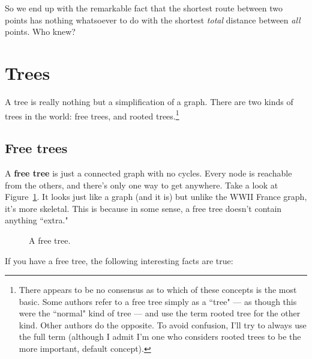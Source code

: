 So we end up with the remarkable fact that the shortest route between two
points has nothing whatsoever to do with the shortest \textit{total}
distance between \textit{all} points. Who knew?






\section{Trees}

A tree is really nothing but a simplification of a graph. There are two
kinds of trees in the world: free trees, and rooted trees.\footnote{There
appears to be no consensus as to which of these concepts is the most basic.
Some authors refer to a free tree simply as a ``tree" --- as though this
were the ``normal" kind of tree --- and use the term rooted tree for the
other kind. Other authors do the opposite. To avoid confusion, I'll try to
always use the full term (although I admit I'm one who considers rooted
trees to be the more important, default concept).}

\subsection{Free trees}

A \textbf{free tree} is just a connected graph with no cycles. Every node
is reachable from the others, and there's only one way to get anywhere.
Take a look at Figure~\ref{freetree}. It looks just like a graph (and it
is) but unlike the WWII France graph, it's more skeletal. This is because
in some sense, a free tree doesn't contain anything ``extra."

\begin{figure}[ht]
\centering
\begin{custommargins}{-2.1cm}{-3cm}
\caption{A free tree.}
\label{freetree}
\end{custommargins}
\end{figure}

If you have a free tree, the following interesting facts are true:

